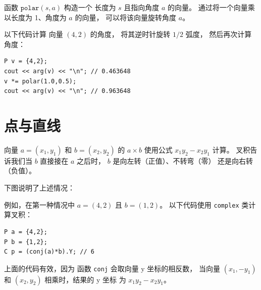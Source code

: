 函数 $\texttt{polar}(s,a)$ 构造一个
长度为 $s$ 且指向角度 $a$ 的向量。
通过将一个向量乘以长度为 1、角度为 $a$ 的向量，
可以将该向量旋转角度 $a$。

以下代码计算
向量 $(4,2)$ 的角度，
将其逆时针旋转 $1/2$ 弧度，
然后再次计算角度：

\begin{lstlisting}
P v = {4,2};
cout << arg(v) << "\n"; // 0.463648
v *= polar(1.0,0.5);
cout << arg(v) << "\n"; // 0.963648
\end{lstlisting}

\section{点与直线}


向量 $a=(x_1,y_1)$ 和 $b=(x_2,y_2)$ 的
$a \times b$ 使用公式 $x_1 y_2 - x_2 y_1$ 计算。
叉积告诉我们当 $b$ 直接接在 $a$ 之后时，
$b$ 是向左转（正值）、不转弯（零）
还是向右转（负值）。

下图说明了上述情况：
\begin{center}
\end{center}

\noindent
例如，在第一种情况中
$a=(4,2)$ 且 $b=(1,2)$。
以下代码使用 \texttt{complex} 类计算叉积：

\begin{lstlisting}
P a = {4,2};
P b = {1,2};
C p = (conj(a)*b).Y; // 6
\end{lstlisting}

上面的代码有效，因为
函数 \texttt{conj} 会取向量 y 坐标的相反数，
当向量 $(x_1,-y_1)$ 和 $(x_2,y_2)$
相乘时，结果的 y 坐标
为 $x_1 y_2 - x_2 y_1$。

